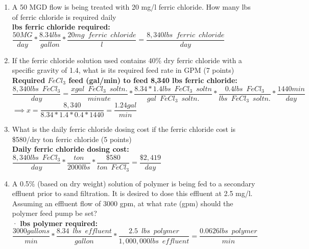 \begin{enumerate}
\vspace{0.25cm}
\item A 50 MGD flow is being treated with 20 mg/l ferric chloride.   How many lbs of ferric chloride is required daily \\
\vspace{0.3cm}
\textbf{lbs ferric chloride required:}\\
$\dfrac{50 MG}{day}*\dfrac{8.34lbs}{gallon}*\dfrac{20mg \enspace ferric \enspace chloride}{l}=\boxed{\dfrac{8,340 lbs \enspace ferric \enspace chloride}{day}}$\\
\vspace{0.25cm}
\item If the ferric chloride solution used contains 40\% dry ferric chloride with a specific gravity of 1.4, what is its required feed rate in GPM (7 points)\\
\vspace{0.25cm}
\textbf{Required $FeCl_3$ feed (gal/min) to feed 8,340 lbs ferric chloride:}\\
$\dfrac{8,340 lbs \enspace FeCl_3}{day}=\dfrac{x gal \enspace FeCl_3 \enspace soltn.}{minute}*\dfrac{8.34*1.4 lbs \enspace FeCl_3 \enspace soltn}{gal \enspace FeCl_3 \enspace soltn.}*\dfrac{0.4 lbs \enspace FeCl_3}{lbs \enspace FeCl_3 \enspace soltn.}*\dfrac{1440min}{day}$\\
$\implies x=\dfrac{8,340}{8.34*1.4*0.4*1440}=\boxed{\dfrac{1.24gal}{min}}$\\
\vspace{0.25cm}
\item What is the daily ferric chloride dosing cost if the ferric chloride cost is \$580/dry ton ferric chloride (5 points)\\
\textbf{Daily ferric chloride dosing cost:}\\
\vspace{0.25cm}
$\dfrac{8,340lbs \enspace FeCl_3}{day}*\dfrac{ton}{2000 lbs}*\dfrac{\$580}{ton \enspace FeCl_3}=\boxed{\dfrac{\$2,419}{day}}$
\vspace{0.25cm}
\item A 0.5\% (based on dry weight) solution of polymer is being fed to a secondary effluent prior to sand filtration. It is desired to dose this effluent at 2.5 mg/l. Assuming an effluent flow of 3000 gpm, at what rate (gpm)  should  the polymer feed pump be set?\\	·
\vspace{0.25cm}
\textbf{lbs polymer required:}\\
$\dfrac{3000 gallons}{min}*\dfrac{8.34 \enspace lbs \enspace effluent}{gallon}*\dfrac{2.5 \enspace lbs \enspace polymer}{1,000,000 lbs \enspace effluent}=\dfrac{0.0626 lbs \enspace polymer}{min}$\\

\end{enumerate}
